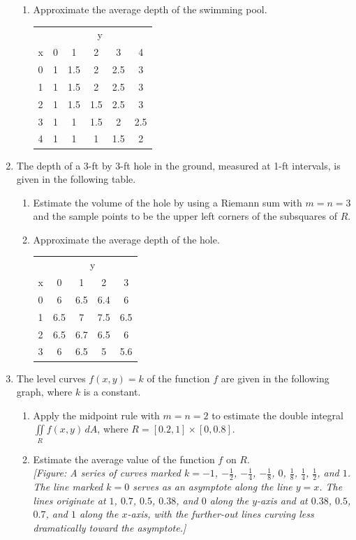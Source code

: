 \documentclass{exercises}
\begin{document}
\begin{enumerate}[resume]
\begin{enumerate}[label=(\alph*)]
  \item Approximate the average depth of the swimming pool.\\ \begin{center} \begin{tabular}{lccccc} \hline  & \multicolumn{5}{c}{y} \\ x & 0 & 1 & 2 & 3 & 4 \\ 0 & 1 & 1.5 & 2 & 2.5 & 3 \\ 1 & 1 & 1.5 & 2 & 2.5 & 3 \\ 2 & 1 & 1.5 & 1.5 & 2.5 & 3 \\ 3 & 1 & 1 & 1.5 & 2 & 2.5 \\ 4 & 1 & 1 & 1 & 1.5 & 2 \\ \hline \end{tabular} \end{center}
\end{enumerate}
\item The depth of a 3-ft by 3-ft hole in the ground, measured at 1-ft intervals, is given in the following table.
\begin{enumerate}[label=(\alph*)]
  \item Estimate the volume of the hole by using a Riemann sum with $m=n=3$ and the sample points to be the upper left corners of the subsquares of $R$.
  \item Approximate the average depth of the hole.\\ \begin{center} \begin{tabular}{lcccc} \hline  & \multicolumn{4}{c}{y} \\ x & 0 & 1 & 2 & 3 \\ 0 & 6 & 6.5 & 6.4 & 6 \\ 1 & 6.5 & 7 & 7.5 & 6.5 \\ 2 & 6.5 & 6.7 & 6.5 & 6 \\ 3 & 6 & 6.5 & 5 & 5.6 \\ \hline \end{tabular} \end{center}
\end{enumerate}
\item The level curves $f(x,y)=k$ of the function $f$ are given in the following graph, where $k$ is a constant.
\begin{enumerate}[label=(\alph*)]
  \item Apply the midpoint rule with $m=n=2$ to estimate the double integral $\underset{R}{\iint}f(x,y)\,dA$, where $R=[0.2,1]\times [0,0.8]$.
  \item Estimate the average value of the function $f$ on $R$.\\ \textit{[Figure: A series of curves marked $k=-1$, $-\frac{1}{2}$, $-\frac{1}{4}$, $-\frac{1}{8}$, $0$, $\frac{1}{8}$, $\frac{1}{4}$, $\frac{1}{2}$, and $1$. The line marked $k=0$ serves as an asymptote along the line $y=x$. The lines originate at $1$, $0.7$, $0.5$, $0.38$, and $0$ along the $y$-axis and at $0.38$, $0.5$, $0.7$, and $1$ along the $x$-axis, with the further-out lines curving less dramatically toward the asymptote.]}

\end{enumerate}
\end{enumerate}
\end{document}
